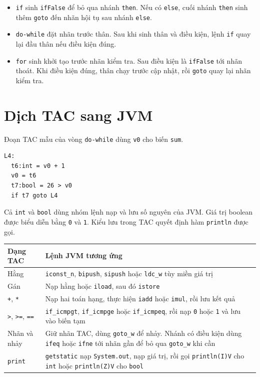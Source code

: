 \documentclass[11pt,a4paper]{article}
\newcommand{\tm}[1]{\texttt{\textcolor{upltok}{#1}}}
\begin{document}
\begin{itemize}
  \item \tm{if} sinh \texttt{ifFalse} để bỏ qua nhánh \tm{then}. Nếu có
        \tm{else}, cuối nhánh \tm{then} sinh thêm \texttt{goto} đến nhãn
        hội tụ sau nhánh \tm{else}.
  \item \tm{do-while} đặt nhãn trước thân. Sau khi sinh thân và điều kiện,
        lệnh \texttt{if} quay lại đầu thân nếu điều kiện đúng.
  \item \tm{for} sinh khởi tạo trước nhãn kiểm tra. Sau điều kiện là
        \texttt{ifFalse} tới nhãn thoát. Khi điều kiện đúng, thân chạy trước
        cập nhật, rồi \texttt{goto} quay lại nhãn kiểm tra.
\end{itemize}

\clearpage
\section{Dịch TAC sang JVM}

Đoạn TAC mẫu của vòng \tm{do-while} dùng \texttt{v0} cho biến \texttt{sum}.

\begin{lstlisting}[language={}]
L4:
  t6:int = v0 + 1
  v0 = t6
  t7:bool = 26 > v0
  if t7 goto L4
\end{lstlisting}

Cả \tm{int} và \tm{bool} dùng nhóm lệnh nạp và lưu số nguyên của JVM.
Giá trị boolean được biểu diễn bằng \texttt{0} và \texttt{1}. Kiểu lưu trong
TAC quyết định hàm \texttt{println} được gọi.

\begin{tabularx}{\linewidth}{@{}>{\raggedright\arraybackslash}p{4cm} X@{}}
\toprule
\textbf{Dạng TAC} & \textbf{Lệnh JVM tương ứng} \\
\midrule
Hằng & \texttt{iconst\_n}, \texttt{bipush}, \texttt{sipush} hoặc
       \texttt{ldc\_w} tùy miền giá trị \\
Gán & Nạp hằng hoặc \texttt{iload}, sau đó \texttt{istore} \\
\tm{+}, \tm{*} & Nạp hai toán hạng, thực hiện \texttt{iadd} hoặc
                    \texttt{imul}, rồi lưu kết quả \\
\tm{>}, \tm{>=}, \tm{==} & \texttt{if\_icmpgt}, \texttt{if\_icmpge} hoặc
  \texttt{if\_icmpeq}, rồi nạp \texttt{0} hoặc \texttt{1} và lưu vào biến tạm \\
Nhãn và nhảy & Giữ nhãn TAC, dùng \texttt{goto\_w} để nhảy. Nhánh có điều
  kiện dùng \texttt{ifeq} hoặc \texttt{ifne} tới nhãn gần để bỏ qua
  \texttt{goto\_w} khi cần \\
\tm{print} & \texttt{getstatic} nạp \texttt{System.out}, nạp giá trị, rồi gọi
  \texttt{println(I)V} cho \tm{int} hoặc \texttt{println(Z)V} cho \tm{bool} \\
\bottomrule
\end{tabularx}
\end{document}
